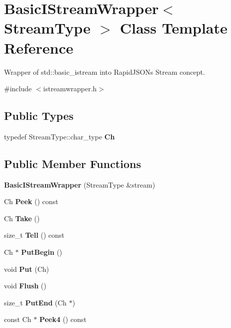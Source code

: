 \hypertarget{a02292}{}\section{Basic\+I\+Stream\+Wrapper$<$ Stream\+Type $>$ Class Template Reference}
\label{a02292}


Wrapper of {\ttfamily std\+::basic\+\_\+istream} into Rapid\+J\+S\+ON\textquotesingle{}s Stream concept.  




{\ttfamily \#include $<$istreamwrapper.\+h$>$}

\subsection*{Public Types}
\begin{DoxyCompactItemize}
\item 
\mbox{\label{a02292_a88e4288ecdaa0d31ddf4e5917b9aa8d7}} 
typedef Stream\+Type\+::char\+\_\+type {\bfseries Ch}
\end{DoxyCompactItemize}
\subsection*{Public Member Functions}
\begin{DoxyCompactItemize}
\item 
\mbox{\label{a02292_a3e9a2dd2b6b28243f8f2a911f67cdf56}} 
{\bfseries Basic\+I\+Stream\+Wrapper} (Stream\+Type \&stream)
\item 
\mbox{\label{a02292_a0ad1488235b4786dd4f7a16e679dec88}} 
Ch {\bfseries Peek} () const
\item 
\mbox{\label{a02292_afb71f0329d0abbbc9b22ebeb5c1464d1}} 
Ch {\bfseries Take} ()
\item 
\mbox{\label{a02292_ac212848265f937add49bd973de794e25}} 
size\+\_\+t {\bfseries Tell} () const
\item 
\mbox{\label{a02292_a62a3fc10b009ea231fb9d2dc958c539c}} 
Ch $\ast$ {\bfseries Put\+Begin} ()
\item 
\mbox{\label{a02292_afa71cb2f5b7668837d0a81e3bce55e69}} 
void {\bfseries Put} (Ch)
\item 
\mbox{\label{a02292_a37d5e4cd8fdf3c83dad50737e95886a9}} 
void {\bfseries Flush} ()
\item 
\mbox{\label{a02292_ab2ead53490207a1cb0bdd674a03957f3}} 
size\+\_\+t {\bfseries Put\+End} (Ch $\ast$)
\item 
\mbox{\label{a02292_ae8b52683adc67ca0b91484a427aed660}} 
const Ch $\ast$ {\bfseries Peek4} () const
\end{DoxyCompactItemize}


